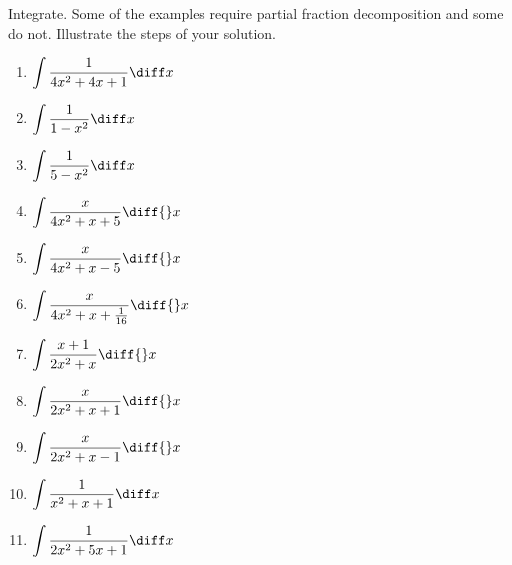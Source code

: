 Integrate. Some of the examples require partial fraction decomposition and some do not. Illustrate the steps of your solution. 
\begin{multicols}{2}
\begin{enumerate}
\item $\displaystyle\int \frac{1}{4x^2+4x+1}\diff x$

\item $\displaystyle \int \frac{1}{1-x^2}\diff x$


\item $\displaystyle \int \frac{1}{5-x^2}\diff x$


\item $\displaystyle \int \frac{x}{4x^2+x+5}\diff {}x$

\item $\displaystyle \int \frac{x}{4x^2+x-5}\diff {}x$
\item $\displaystyle \int \frac{x}{4x^2 +x+ \frac{ 1}{16}}\diff {}x$

\item $\displaystyle \int \frac{x+1}{2x^2+x}\diff {}x$

\item $\displaystyle \int \frac{x}{2x^2+x+1}\diff {}x$

\item \label{problemIntegrate x/(2x^2+x-1)dx}
$\displaystyle\int \frac{x }{2x^2+x-1}\diff{}x
$


\item $\displaystyle\int \frac{1}{x^2+x+1}\diff x$

\item $\displaystyle\int \frac{1}{2x^2+5x+1}\diff x$

\end{enumerate}
\end{multicols}
